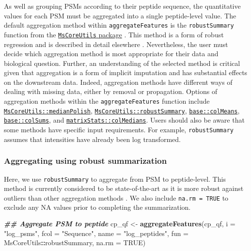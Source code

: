 \documentclass[9pt,a4paper,]{extarticle}
\newenvironment{Shaded}{\begin{snugshade}}{\end{snugshade}}
\newcommand{\AttributeTok}[1]{\textcolor[rgb]{0.13,0.29,0.53}{#1}}
\newcommand{\ConstantTok}[1]{\textcolor[rgb]{0.56,0.35,0.01}{#1}}
\newcommand{\DocumentationTok}[1]{\textcolor[rgb]{0.56,0.35,0.01}{\textbf{\textit{#1}}}}
\newcommand{\FunctionTok}[1]{\textcolor[rgb]{0.13,0.29,0.53}{\textbf{#1}}}
\newcommand{\NormalTok}[1]{#1}
\newcommand{\OtherTok}[1]{\textcolor[rgb]{0.56,0.35,0.01}{#1}}
\newcommand{\SpecialCharTok}[1]{\textcolor[rgb]{0.81,0.36,0.00}{\textbf{#1}}}
\newcommand{\StringTok}[1]{\textcolor[rgb]{0.31,0.60,0.02}{#1}}
\begin{document}
As well as grouping PSMs according to their peptide sequence, the quantitative
values for each PSM must be aggregated into a single peptide-level value. The
default aggregation method within \texttt{aggregateFeatures} is the \texttt{robustSummary}
function from the
\href{https://bioconductor.org/packages/release/bioc/html/MsCoreUtils.html}{\texttt{MsCoreUtils} package}
\citep{Rainer2022}. This method is a form of robust regression and is described in
detail elsewhere \citep{Sticker2020}. Nevertheless, the user must decide which
aggregation method is most appropriate for their data and biological question.
Further, an understanding of the selected method is critical given that
aggregation is a form of implicit imputation and has substantial effects on the
downstream data. Indeed, aggregation methods have different ways of dealing with
missing data, either by removal or propagation. Options of aggregation methods
within the \texttt{aggregateFeatures} function include
\href{https://rdrr.io/bioc/MsCoreUtils/man/medianPolish.html}{\texttt{MsCoreUtils::medianPolish}},
\href{https://rdrr.io/bioc/MsCoreUtils/man/robustSummary.html}{\texttt{MsCoreUtils::robustSummary}},
\href{https://www.rdocumentation.org/packages/base/versions/3.6.2/topics/colSums}{\texttt{base::colMeans}},
\href{https://www.rdocumentation.org/packages/base/versions/3.6.2/topics/colSums}{\texttt{base::colSums}},
and \href{https://rdrr.io/rforge/matrixStats/man/rowMedians.html}{\texttt{matrixStats::colMedians}}.
Users should also be aware that some methods have specific input requirements.
For example, \texttt{robustSummary} assumes that intensities have already been log
transformed.

\subsubsection{Aggregating using robust summarization}\label{aggregating-using-robust-summarization}

Here, we use \texttt{robustSummary} to aggregate from PSM to peptide-level. This method
is currently considered to be state-of-the-art as it is more robust against
outliers than other aggregation methods \citep{Sticker2020, Goeminne2016}. We also
include \texttt{na.rm\ =\ TRUE} to exclude any NA values prior to completing the
summarization.

\begin{Shaded}
\begin{Highlighting}[]
\DocumentationTok{\#\# Aggregate PSM to peptide}
\NormalTok{cp\_qf }\OtherTok{\textless{}{-}} \FunctionTok{aggregateFeatures}\NormalTok{(cp\_qf,}
                           \AttributeTok{i =} \StringTok{"log\_psms"}\NormalTok{,}
                           \AttributeTok{fcol =} \StringTok{"Sequence"}\NormalTok{,}
                           \AttributeTok{name =} \StringTok{"log\_peptides"}\NormalTok{,}
                           \AttributeTok{fun =}\NormalTok{ MsCoreUtils}\SpecialCharTok{::}\NormalTok{robustSummary,}
                           \AttributeTok{na.rm =} \ConstantTok{TRUE}\NormalTok{)}
\end{Highlighting}
\end{Shaded}
\end{document}
